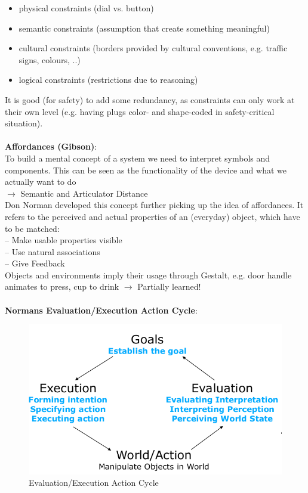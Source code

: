\begin{itemize}
\item physical constraints (dial vs. button)
\item semantic constraints (assumption that create something meaningful)
\item cultural constraints (borders provided by cultural conventions, e.g. traffic signs, colours, ..)
\item logical constraints (restrictions due to reasoning)
\end{itemize}
It is good (for safety) to add some redundancy, as constraints can only work at their own level (e.g. having plugs color- and shape-coded in safety-critical situation).\\\\
\textbf{Affordances (Gibson)}:\\
To build a mental concept of a system we need to interpret symbols and components. This can be seen as the functionality of the device and what we actually want to do\\
$\rightarrow$ Semantic and Articulator Distance\\
Don Norman developed this concept further picking up the idea of affordances. It refers to the perceived and actual properties of an (everyday) object, which have to be matched:\\
-- Make usable properties visible\\
-- Use natural associations\\
-- Give Feedback\\
Objects and environments imply their usage through Gestalt, e.g. door handle animates to press, cup to drink $\rightarrow$ Partially learned!\\\\
\textbf{Normans Evaluation/Execution Action Cycle}:
\begin{figure}[h!]
	\centering
	\includegraphics[width=.4\textwidth]{img/ch05_cycle1.png}
	\caption{Evaluation/Execution Action Cycle}
	\label{cy}
\end{figure}
